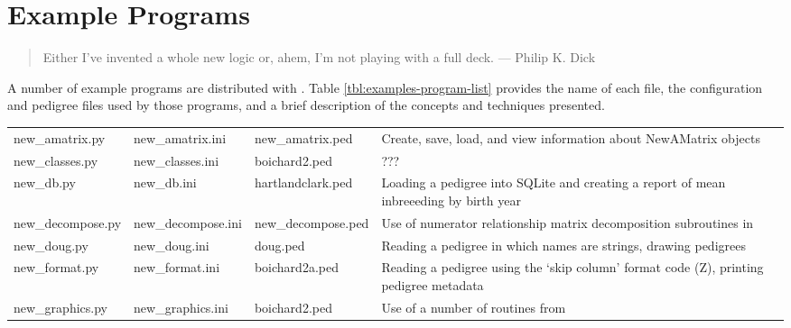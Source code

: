 \appendix
{}
\chapter{Example Programs}\label{cha:example-programs}
\begin{quote}
 Either I've invented a whole new logic or, ahem, I'm not playing with a full deck. --- Philip K. Dick
\end{quote}

A number of example programs are distributed with \PyPedal{}. Table \ref{tbl:examples-program-list} provides the name of each file, the configuration and pedigree files used by those programs, and a brief description of the concepts and techniques presented.
\begin{center}
    \tablelasttail{\hline}
    \label{tbl:examples-program-list}
    \begin{xtabular}{l|p{1in}|p{1in}|p{3in}}
    new\_amatrix.py & new\_amatrix.ini & new\_amatrix.ped & Create, save, load, and view information about NewAMatrix objects \\
    new\_classes.py & new\_classes.ini & boichard2.ped & ??? \\
    new\_db.py & new\_db.ini & hartlandclark.ped & Loading a pedigree into SQLite and creating a report of mean inbreeeding by birth year \\
    new\_decompose.py & new\_decompose.ini & new_decompose.ped & Use of numerator relationship matrix decomposition subroutines in  \\
    new\_doug.py & new\_doug.ini & doug.ped & Reading a pedigree in which names are strings, drawing pedigrees \\
    new\_format.py & new\_format.ini & boichard2a.ped & Reading a pedigree using the `skip column' format code (Z), printing pedigree metadata \\
    new\_graphics.py & new\_graphics.ini & boichard2.ped & Use of a number of routines from  \\

\end{xtabular}
\end{center}
